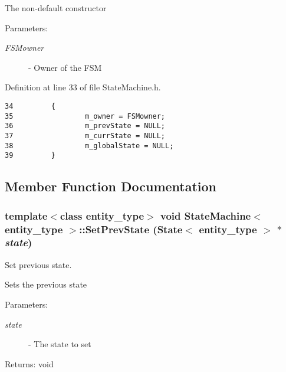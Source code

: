 The non-default constructor

\begin{Desc}
\item[Parameters:]
\begin{description}
\item[{\em FSMowner}]- Owner of the FSM \end{description}
\end{Desc}


Definition at line 33 of file StateMachine.h.

\begin{Code}\begin{verbatim}34         {
35                 m_owner = FSMowner;
36                 m_prevState = NULL;
37                 m_currState = NULL;
38                 m_globalState = NULL;
39         }
\end{verbatim}
\end{Code}




\subsection{Member Function Documentation}
\hypertarget{class_state_machine_7563575ae8101c257dee16be4b196b3d}{
\subsubsection[SetPrevState]{\setlength{\rightskip}{0pt plus 5cm}template$<$class entity\_\-type$>$ void {\bf StateMachine}$<$ entity\_\-type $>$::SetPrevState ({\bf State}$<$ entity\_\-type $>$ $\ast$ {\em state})}}
\label{class_state_machine_7563575ae8101c257dee16be4b196b3d}


Set previous state. 

Sets the previous state

\begin{Desc}
\item[Parameters:]
\begin{description}
\item[{\em state}]- The state to set\end{description}
\end{Desc}
\begin{Desc}
\item[Returns:]void \end{Desc}


